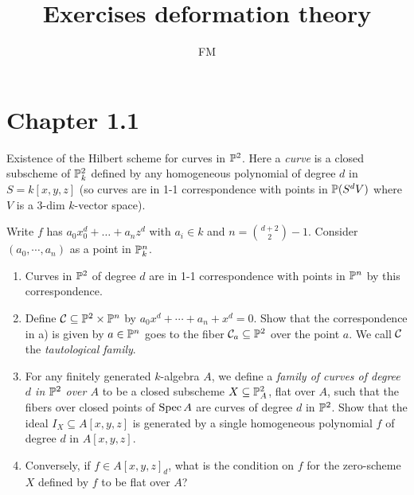 \documentclass[11pt, english]{article}
\title{Exercises deformation theory}
\author{FM}
\date{}
\begin{document}
 
\maketitle
\section{Chapter 1.1}

\begin{exc}
Existence of the Hilbert scheme for curves in $\mathbb{P}^2$. Here a \emph{curve} is a closed subscheme of $\mathbb{P}^2_k$ defined by any homogeneous polynomial of degree $d$ in $S=k[x,y,z]$ (so curves are in 1-1 correspondence with points in $\mathbb{P}(S^dV)$ where $V$ is a $3$-dim $k$-vector space).

Write $f$ has $a_0x_0^d+\dotsc+a_nz^d$ with $a_i \in k$ and $n=\binom{d+2}{2}-1$. Consider $(a_0,\cdots,a_n)$ as a point in $\mathbb{P}_k^n$. 
\begin{enumerate}
\item Curves in $\mathbb{P}^2$ of degree $d$ are in 1-1 correspondence with points in $\mathbb{P}^n$ by this correspondence.
\item Define $\mathcal C \subseteq \mathbb{P}^2 \times \mathbb{P}^n$ by $a_0x^d+\cdots+a_n+x^d=0$. Show that the correspondence in a) is given by $ a \in \mathbb{P}^n$ goes to the fiber $\mathcal C_a \subseteq \mathbb{P}^2$ over the point $a$. We call $\mathcal{C}$ the \emph{tautological family}.
\item For any finitely generated $k$-algebra $A$, we define a \emph{family of curves of degree $d$ in $\mathbb{P}^2$ over $A$} to be a closed subscheme $X \subseteq \mathbb{P}_A^2$, flat over $A$, such that the fibers over closed points of $\operatorname{Spec} A$ are curves of degree $d$ in $\mathbb{P}^2$. Show that the ideal $I_X \subseteq A[x,y,z]$ is generated by a single homogeneous polynomial $f$ of degree $d$ in $A[x,y,z]$.
\item Conversely, if $f \in A[x,y,z]_d$, what is the condition on $f$ for the zero-scheme $X$ defined by $f$ to be flat over $A$? 
\end{enumerate}
\end{exc}
\end{document}
